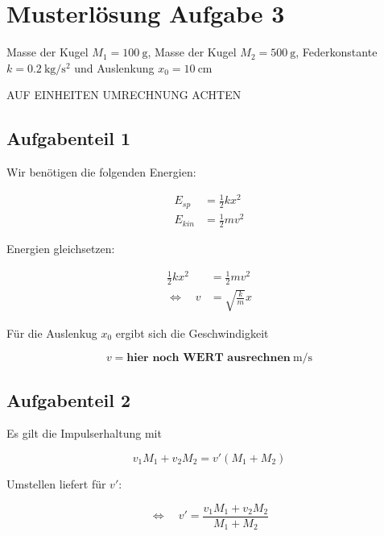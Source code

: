 \section{Musterlösung Aufgabe 3}
Masse der Kugel $M_1=\SI{100}{\gram}$,  
Masse der Kugel $M_2=\SI{500}{\gram}$, 
Federkonstante $k=\SI{0.2}{\kilo\gram\per\square\second}$ und Auslenkung $x_0=\SI{10}{\centi\meter}$

\begin{center}
AUF EINHEITEN UMRECHNUNG ACHTEN
\end{center}
\subsection{Aufgabenteil 1}
Wir benötigen die folgenden Energien:

\begin{align*}
E_{sp}&=\frac{1}{2}kx^2\\
E_{kin}&=\frac{1}{2}mv^2
\end{align*}

Energien gleichsetzen:

\begin{align*}
\frac{1}{2}kx^2&=\frac{1}{2}mv^2\\
\Leftrightarrow \quad v&=\sqrt{\frac{k}{m}}x
\end{align*}

Für die Auslenkug $x_0$ ergibt sich die Geschwindigkeit

\begin{equation*}
v= \textbf{hier noch WERT ausrechnen}\SI{}{\meter\per\second}
\end{equation*}

\subsection{Aufgabenteil 2}

Es gilt die Impulserhaltung mit

\begin{equation*}
v_1M_1+v_2M_2=v'\left(M_1+M_2\right)
\end{equation*}	

Umstellen liefert für $v'$:

\begin{equation*}
\Leftrightarrow \quad v'=\frac{v_1M_1+v_2M_2}{M_1+M_2}
\end{equation*}